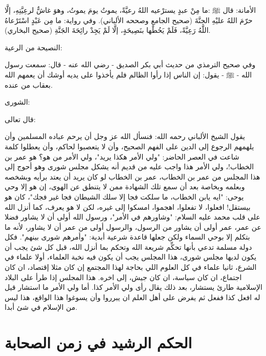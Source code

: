 الأمانة:
قال ﷺ :ما مِنْ عبدٍ يسترْعيه اللهُ رعيَّةً، يموتُ يومَ يموتُ، وهوَ غاشٌّ لرعِيَّتِهِ، إلَّا حرّمَ اللهُ عليْهِ الجنَّةَ {\footnotesize (صحيح الجامع وصححه الألباني)}. وفي رواية: ما مِن عَبْدٍ اسْتَرْعاهُ اللَّهُ رَعِيَّةً، فَلَمْ يَحُطْها بنَصِيحَةٍ، إلَّا لَمْ يَجِدْ رائِحَةَ الجَنَّةِ {\footnotesize (صحيح البخاري)}.

النصيحة من الرعية: 

وفي صحيح الترمذي من حديث أبي بكر الصديق - رضي الله عنه - قال: سمعت رسول الله - ﷺ - يقول: إن الناس إذا رأوا الظالم فلم يأخذوا على يديه أوشك أن يعمهم الله بعقاب من عنده.

الشورى: 

قال تعالى: \quranayah*[42][38]{\footnotesize \surahname*[42]}

يقول الشيخ الألباني رحمه الله: فنسأل الله عز وجل أن يرحم عباده المسلمين وأن يلهمهم الرجوع إلى الدين على الفهم الصحيح، وأن لا يتعصبوا لحاكم، وأن يعطلوا كلمة شاعت في العصر الحاضر: "ولي الأمر هكذا يريد"، ولي الأمر من هو؟ هو عمر بن الخطاب!، ولي الأمر هذا واجب عليه من قديم أنه يشكل مجلس شورى وهو أحوج إلى هذا المجلس من عمر بن الخطاب، عمر بن الخطاب لو كان يريد أن يعتد برأيه وبشخصه وبعلمه وبخاصة بعد أن سمع تلك الشهادة ممن لا يتنطق عن الهوى، إن هو إلا وحي يوحى: "ايه يابن الخطاب، ما سلكت فجا إلا سلك الشيطان فجا غير فجك"، كان هو بيستقل! افعلوا، لا تفعلوا، اهجموا، امسكوا إلى غيره، لكن لا هو يعرف، كما أنزل الله على قلب محمد عليه السلام: "وشاورهم في الأمر"، ورسول الله أولى أن لا يشاور فضلا عن عمر، عمر أولى أن يشاور من الرسول، والرسول أولى من عمر أن لا يشاور، لأنه ما بتكلم إلا بوحي السماء ولكن جعلها قاعدة شرعية أبدية: "وأمرهم شورى بينهم". فكل دولة مسلمة تدعي بأنها تحكِّم شريعة الله وتحكم بما أنزل الله، قبل كل شئ يجب أن يكون لديها مجلس شورى، هذا المجلس يجب أن يكون فيه نخبة العلماء، أولا علماء في الشرع، ثانيا علماء في كل العلوم اللي بحاجة لهذا المجتمع إن كان مثلا إقتصاد، ان كان اجتماع، ان كان سياسة، ان كان جيش، إلى اخره. هذا المجلس إذا طرأ على البلاد الإسلامية طارئ يستشار، بعد ذلك يقال رأى ولي الأمر كذا. أما ولي الأمر ما استشار قيل له افعل كذا ففعل ثم يفرض على أهل العلم ان يبرروا وأن يسوغوا هذا الواقع، هذا ليس من الإسلام في شئ أبدا. 

\section{الحكم الرشيد في زمن الصحابة}



